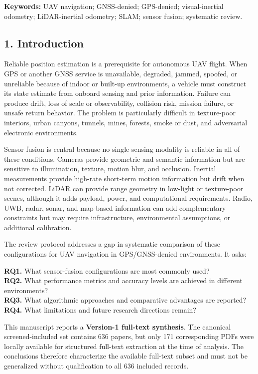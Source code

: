 \documentclass[
  journal]{IEEEtran}
\begin{document}
\textbf{Keywords:} UAV navigation; GNSS-denied; GPS-denied;
visual-inertial odometry; LiDAR-inertial odometry; SLAM; sensor fusion;
systematic review.

\subsection{1. Introduction}\label{1-introduction}

Reliable position estimation is a prerequisite for autonomous UAV
flight. When GPS or another GNSS service is unavailable, degraded,
jammed, spoofed, or unreliable because of indoor or built-up
environments, a vehicle must construct its state estimate from onboard
sensing and prior information. Failure can produce drift, loss of scale
or observability, collision risk, mission failure, or unsafe return
behavior. The problem is particularly difficult in texture-poor
interiors, urban canyons, tunnels, mines, forests, smoke or dust, and
adversarial electronic environments.

Sensor fusion is central because no single sensing modality is reliable
in all of these conditions. Cameras provide geometric and semantic
information but are sensitive to illumination, texture, motion blur, and
occlusion. Inertial measurements provide high-rate short-term motion
information but drift when not corrected. LiDAR can provide range
geometry in low-light or texture-poor scenes, although it adds payload,
power, and computational requirements. Radio, UWB, radar, sonar, and
map-based information can add complementary constraints but may require
infrastructure, environmental assumptions, or additional calibration.

The review protocol addresses a gap in systematic comparison of these
configurations for UAV navigation in GPS/GNSS-denied environments. It
asks:

\textbf{RQ1.} What sensor-fusion configurations are most commonly
used?\\
\textbf{RQ2.} What performance metrics and accuracy levels are achieved
in different environments?\\
\textbf{RQ3.} What algorithmic approaches and comparative advantages are
reported?\\
\textbf{RQ4.} What limitations and future research directions remain?

This manuscript reports a \textbf{Version-1 full-text synthesis}. The
canonical screened-included set contains 636 papers, but only 171
corresponding PDFs were locally available for structured full-text
extraction at the time of analysis. The conclusions therefore
characterize the available full-text subset and must not be generalized
without qualification to all 636 included records.
\end{document}
